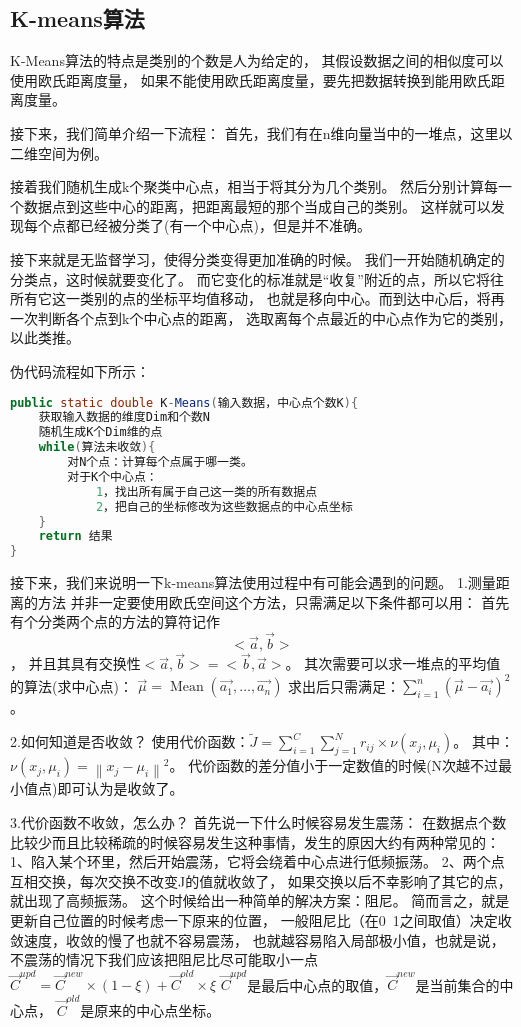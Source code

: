 \subsection{K-means算法}
K-Means算法的特点是类别的个数是人为给定的，
其假设数据之间的相似度可以使用欧氏距离度量，
如果不能使用欧氏距离度量，要先把数据转换到能用欧氏距离度量。

接下来，我们简单介绍一下流程：
首先，我们有在n维向量当中的一堆点，这里以二维空间为例。


接着我们随机生成k个聚类中心点，相当于将其分为几个类别。
然后分别计算每一个数据点到这些中心的距离，把距离最短的那个当成自己的类别。
这样就可以发现每个点都已经被分类了(有一个中心点)，但是并不准确。


接下来就是无监督学习，使得分类变得更加准确的时候。
我们一开始随机确定的分类点，这时候就要变化了。
而它变化的标准就是“收复”附近的点，所以它将往所有它这一类别的点的坐标平均值移动，
也就是移向中心。而到达中心后，将再一次判断各个点到k个中心点的距离，
选取离每个点最近的中心点作为它的类别，以此类推。


伪代码流程如下所示：
\begin{lstlisting}[language=Java]
public static double K-Means(输入数据，中心点个数K){
    获取输入数据的维度Dim和个数N
    随机生成K个Dim维的点
    while(算法未收敛){
        对N个点：计算每个点属于哪一类。
        对于K个中心点：
            1，找出所有属于自己这一类的所有数据点
            2，把自己的坐标修改为这些数据点的中心点坐标
    }
    return 结果
}
\end{lstlisting}

接下来，我们来说明一下k-means算法使用过程中有可能会遇到的问题。
1.测量距离的方法
并非一定要使用欧氏空间这个方法，只需满足以下条件都可以用：
首先有个分类两个点的方法的算符记作$$<\vec{a}, \vec{b}>$$，
并且其具有交换性$<\vec{a}, \vec{b}>=<\vec{b}, \vec{a}>$。
其次需要可以求一堆点的平均值的算法(求中心点)：
$\vec{\mu}=\operatorname{Mean}\left(\overrightarrow{a_{1}}, \ldots, \overrightarrow{a_{n}}\right)$
求出后只需满足：$\sum_{i=1}^{n}\left(\vec{\mu}-\overrightarrow{a_{i}}\right)^{2}$。

2.如何知道是否收敛？
使用代价函数：$\tilde{J}=\sum_{i=1}^{C} \sum_{j=1}^{N} r_{i j} \times \nu\left(x_{j}, \mu_{i}\right)$。
其中：$\nu\left(x_{j}, \mu_{i}\right)=\left\|x_{j}-\mu_{i}\right\|^{2}$。
代价函数的差分值小于一定数值的时候(N次越不过最小值点)即可认为是收敛了。

3.代价函数不收敛，怎么办？
首先说一下什么时候容易发生震荡：
在数据点个数比较少而且比较稀疏的时候容易发生这种事情，发生的原因大约有两种常见的：
1、陷入某个环里，然后开始震荡，它将会绕着中心点进行低频振荡。
2、两个点互相交换，每次交换不改变J的值就收敛了，
如果交换以后不幸影响了其它的点，就出现了高频振荡。
这个时候给出一种简单的解决方案：阻尼。
简而言之，就是更新自己位置的时候考虑一下原来的位置，
一般阻尼比（在0~1之间取值）决定收敛速度，收敛的慢了也就不容易震荡，
也就越容易陷入局部极小值，也就是说，不震荡的情况下我们应该把阻尼比尽可能取小一点
$\vec{C}^{u p d}=\vec{C}^{n e w} \times(1-\xi)+\vec{C}^{o l d} \times \xi$
$\vec{C}^{u p d}$是最后中心点的取值，$\vec{C}^{n e w}$是当前集合的中心点，
$\vec{C}^{o l d}$是原来的中心点坐标。

